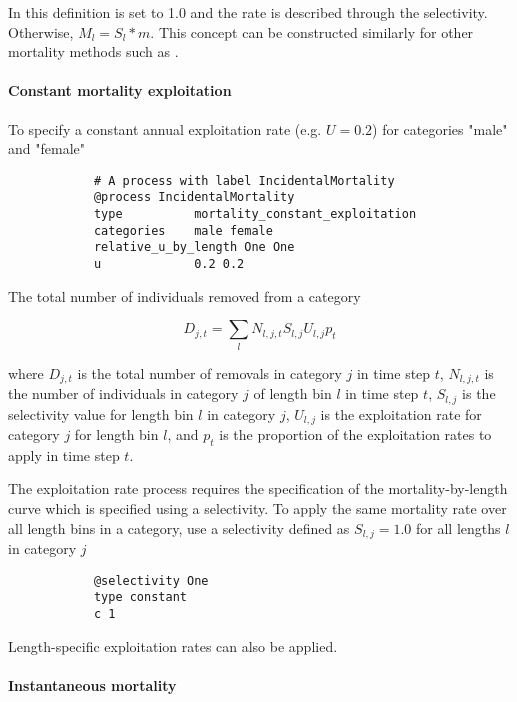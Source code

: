 In this definition  is set to 1.0 and the rate is described through the selectivity. Otherwise, $M_{l} = S_{l} * m$. This concept can be constructed similarly for other mortality methods such as .

\paragraph{Constant mortality exploitation}\label{sec:Process-Length-MortalityConstantExploitation} 

To specify a constant annual exploitation rate (e.g. $U=0.2$) for categories "male" and "female"
{\small{\begin{verbatim}
			# A process with label IncidentalMortality
			@process IncidentalMortality
			type          mortality_constant_exploitation
			categories    male female
			relative_u_by_length One One
			u             0.2 0.2
\end{verbatim}}}

The total number of individuals removed from a category

\begin{equation}
	D_{j,t} = \sum_l N_{l,j,t} S_{l,j} U_{l,j} p_t
\end{equation}

where $D_{j,t}$ is the total number of removals in category $j$ in time step $t$, $N_{l,j,t}$ is the number of individuals in category $j$ of length bin $l$ in time step $t$, $S_{l,j}$ is the selectivity value for length bin $l$ in category $j$, $U_{l,j}$ is the exploitation rate for category $j$ for length bin $l$, and $p_t$ is the proportion of the exploitation rates to apply in time step $t$.

The exploitation rate process requires the specification of the mortality-by-length curve which is specified using a selectivity. To apply the same mortality rate over all length bins in a category, use a selectivity defined as $S_{l,j}=1.0$ for all lengths $l$ in category $j$

{\small{\begin{verbatim}
			@selectivity One
			type constant
			c 1
\end{verbatim}}}

Length-specific exploitation rates can also be applied. 

\paragraph{Instantaneous mortality}\label{sec:Process-Length-MortalityInstantaneous}

